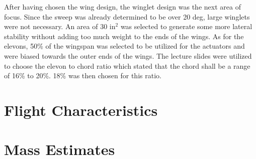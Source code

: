     After having chosen the wing design, the winglet design was the next area of focus. Since the sweep was already determined to be over 20 deg, large winglets were not necessary. An area of 30 in$^2$ was selected to generate some more lateral stability without adding too much weight to the ends of the wings. As for the elevons, 50\% of the wingspan was selected to be utilized for the actuators and were biased towards the outer ends of the wings. The lecture slides were utilized to choose the elevon to chord ratio which stated that the chord shall be a range of 16\% to 20\%. 18\% was then chosen for this ratio.


\section{Flight Characteristics}

\section{Mass Estimates}

